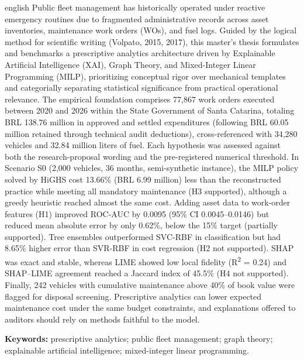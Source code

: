 \begin{resumo}[ABSTRACT]
\begin{otherlanguage*}{english}
Public fleet management has historically operated under reactive emergency routines due to fragmented administrative records across asset inventories, maintenance work orders (WOs), and fuel logs. Guided by the logical method for scientific writing (Volpato, 2015, 2017), this master's thesis formulates and benchmarks a prescriptive analytics architecture driven by Explainable Artificial Intelligence (XAI), Graph Theory, and Mixed-Integer Linear Programming (MILP), prioritizing conceptual rigor over mechanical templates and categorially separating statistical significance from practical operational relevance. The empirical foundation comprises 77,867 work orders executed between 2020 and 2026 within the State Government of Santa Catarina, totaling BRL 138.76 million in approved and settled expenditures (following BRL 60.05 million retained through technical audit deductions), cross-referenced with 34,280 vehicles and 32.84 million liters of fuel. Each hypothesis was assessed against both the research-proposal wording and the pre-registered numerical threshold. In Scenario S0 (2,000 vehicles, 36 months, semi-synthetic instance), the MILP policy solved by HiGHS cost 13.66\% (BRL 6.99 million) less than the reconstructed practice while meeting all mandatory maintenance (H3 supported), although a greedy heuristic reached almost the same cost. Adding asset data to work-order features (H1) improved ROC-AUC by 0.0095 (95\% CI 0.0045--0.0146) but reduced mean absolute error by only 0.62\%, below the 15\% target (partially supported). Tree ensembles outperformed SVC-RBF in classification but had 8.65\% higher error than SVR-RBF in cost regression (H2 not supported). SHAP was exact and stable, whereas LIME showed low local fidelity (R\textsuperscript{2} = 0.24) and SHAP--LIME agreement reached a Jaccard index of 45.5\% (H4 not supported). Finally, 242 vehicles with cumulative maintenance above 40\% of book value were flagged for disposal screening. Prescriptive analytics can lower expected maintenance cost under the same budget constraints, and explanations offered to auditors should rely on methods faithful to the model.

\vspace{\onelineskip}
\noindent
\textbf{Keywords:} prescriptive analytics; public fleet management; graph theory; explainable artificial intelligence; mixed-integer linear programming.
\end{otherlanguage*}
\end{resumo}
